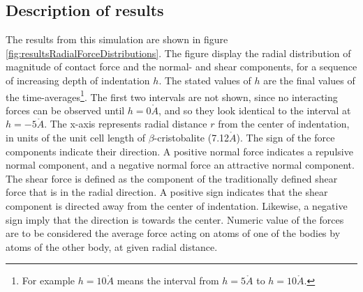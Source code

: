 \documentclass[twoside,english]{uiofysmaster}
\begin{document}
\subsection{Description of results}
The results from this simulation are shown in figure \ref{fig:resultsRadialForceDistributions}. 
The figure display the radial distribution of magnitude of contact force and the normal- and shear components, for a sequence of increasing depth of indentation $h$. 
The stated values of $h$ are the final values of the time-averages\footnote{For example $h=10\mathring{A}$ means the interval from $h=5\mathring{A}$ to $h=10\mathring{A}$.}.    
The first two intervals are not shown, since no interacting forces can be observed until $h=0\mathring{A}$, and so they look identical to the interval at $h=-5\mathring{A}$.
The x-axis represents radial distance $r$ from the center of indentation, in units of the unit cell length of $\beta$-cristobalite (7.12$\mathring{A}$). 
The sign of the force components indicate their direction.
A positive normal force indicates a repulsive normal component, and a negative normal force an attractive normal component. 
The shear force is defined as the component of the traditionally defined shear force that is in the radial direction. 
A positive sign indicates that the shear component is directed away from the center of indentation.
Likewise, a negative sign imply that the direction is towards the center. 
Numeric value of the forces are to be considered the average force acting on atoms of one of the bodies by atoms of the other body, at given radial distance. 
\end{document}
